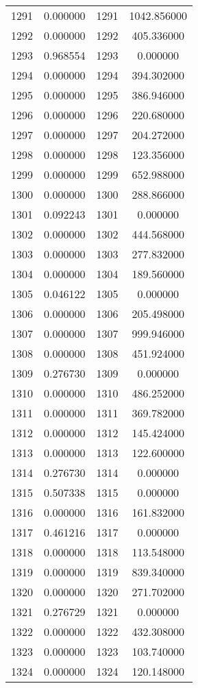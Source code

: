 \documentclass[12pt]{article}
\begin{document}
\begin{longtable}{@{}cccc@{}}
1291 & 0.000000 & 1291 & 1042.856000 \\
1292 & 0.000000 & 1292 & 405.336000 \\
1293 & 0.968554 & 1293 & 0.000000 \\
1294 & 0.000000 & 1294 & 394.302000 \\
1295 & 0.000000 & 1295 & 386.946000 \\
1296 & 0.000000 & 1296 & 220.680000 \\
1297 & 0.000000 & 1297 & 204.272000 \\
1298 & 0.000000 & 1298 & 123.356000 \\
1299 & 0.000000 & 1299 & 652.988000 \\
1300 & 0.000000 & 1300 & 288.866000 \\
1301 & 0.092243 & 1301 & 0.000000 \\
1302 & 0.000000 & 1302 & 444.568000 \\
1303 & 0.000000 & 1303 & 277.832000 \\
1304 & 0.000000 & 1304 & 189.560000 \\
1305 & 0.046122 & 1305 & 0.000000 \\
1306 & 0.000000 & 1306 & 205.498000 \\
1307 & 0.000000 & 1307 & 999.946000 \\
1308 & 0.000000 & 1308 & 451.924000 \\
1309 & 0.276730 & 1309 & 0.000000 \\
1310 & 0.000000 & 1310 & 486.252000 \\
1311 & 0.000000 & 1311 & 369.782000 \\
1312 & 0.000000 & 1312 & 145.424000 \\
1313 & 0.000000 & 1313 & 122.600000 \\
1314 & 0.276730 & 1314 & 0.000000 \\
1315 & 0.507338 & 1315 & 0.000000 \\
1316 & 0.000000 & 1316 & 161.832000 \\
1317 & 0.461216 & 1317 & 0.000000 \\
1318 & 0.000000 & 1318 & 113.548000 \\
1319 & 0.000000 & 1319 & 839.340000 \\
1320 & 0.000000 & 1320 & 271.702000 \\
1321 & 0.276729 & 1321 & 0.000000 \\
1322 & 0.000000 & 1322 & 432.308000 \\
1323 & 0.000000 & 1323 & 103.740000 \\
1324 & 0.000000 & 1324 & 120.148000 \\

\end{longtable}
\end{document}
